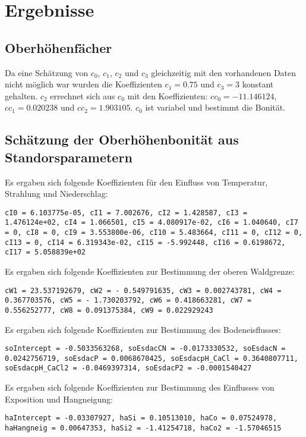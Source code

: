 \documentclass[twocolumn]{scrartcl}
\begin{document}
\section{Ergebnisse}

\subsection{Oberhöhenfächer}

Da eine Schätzung von $c_0$, $c_1$, $c_2$ und $c_3$ gleichzeitig mit
den vorhandenen Daten nicht möglich war wurden die Koeffizienten
$c_1=0.75$ und $c_3=3$ konstant gehalten. $c_2$ errechnet sich aus
$c_0$ mit den Koeffizienten: $cc_0 = -11.146124$, $cc_1 = 0.020238$
und $cc_2 = 1.903105$. $c_0$ ist variabel und bestimmt die Bonität.

\subsection{Schätzung der Oberhöhenbonität aus Standorsparametern}

Es ergaben sich folgende Koeffizienten für den Einfluss von
Temperatur, Strahlung und Niederschlag:

\texttt{cI0 = 6.103775e-05, cI1 = 7.002676, cI2 = 1.428587, cI3 = 1.476124e+02, cI4 = 1.066501, cI5 = 4.080917e-02, cI6 = 1.040640, cI7 = 0, cI8 = 0, cI9 = 3.553800e-06, cI10 = 5.483664, cI11 = 0, cI12 = 0, cI13 = 0, cI14 = 6.319343e-02, cI15 = -5.992448, cI16 = 0.6198672, cI17 = 5.058839e+02}

Es ergaben sich folgende Koeffizienten zur Bestimmung der oberen Waldgrenze:

\texttt{cW1 = 23.537192679, cW2 = - 0.549791635, cW3 = 0.002743781, cW4 = 0.367703576, cW5 = - 1.730203792, cW6 = 0.418663281, cW7 = 0.556252777, cW8 = 0.091375384, cW9 = 0.022929243}

Es ergaben sich folgende Koeffizienten zur Bestimmung des Bodeneisflusses:

\texttt{soIntercept = -0.5033563268, soEsdacCN = -0.0173330532, soEsdacN = 0.0242756719, soEsdacP = 0.0068670425, soEsdacpH_CaCl = 0.3640807711, soEsdacpH_CaCl2 = -0.0469397314, soEsdacP2 = -0.0001540427}

Es ergaben sich folgende Koeffizienten zur Bestimmung des Einflusses von Exposition und Hangneigung:

\texttt{haIntercept = -0.03307927, haSi = 0.10513010, haCo = 0.07524978, haHangneig = 0.00647353, haSi2 = -1.41254718, haCo2 = -1.57046515}
\end{document}
